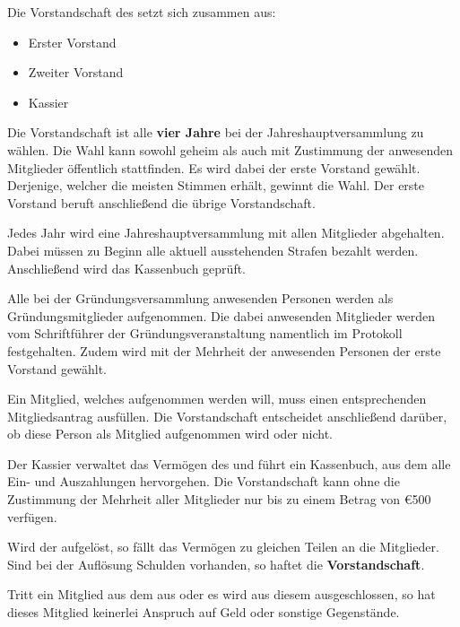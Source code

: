 Die Vorstandschaft des \emph{\vereinsName} setzt sich zusammen aus:
\begin{itemize}
    \item Erster Vorstand
    \item Zweiter Vorstand
    \item Kassier
\end{itemize}

Die Vorstandschaft ist alle \textbf{vier Jahre}
bei der Jahreshauptversammlung zu wählen.
Die Wahl kann sowohl geheim als auch mit Zustimmung der anwesenden Mitglieder
öffentlich stattfinden.
Es wird dabei der erste Vorstand gewählt.
Derjenige, welcher die meisten Stimmen erhält, gewinnt die Wahl.
Der erste Vorstand beruft anschließend die übrige Vorstandschaft.

Jedes Jahr wird eine Jahreshauptversammlung mit allen Mitglieder abgehalten.
Dabei müssen zu Beginn alle aktuell ausstehenden Strafen bezahlt werden.
Anschließend wird das Kassenbuch geprüft.

Alle bei der Gründungsversammlung anwesenden Personen werden als Gründungsmitglieder aufgenommen.
Die dabei anwesenden Mitglieder werden vom Schriftführer der Gründungsveranstaltung namentlich im Protokoll festgehalten.
Zudem wird mit der Mehrheit der anwesenden Personen der erste Vorstand gewählt.

Ein Mitglied, welches aufgenommen werden will, muss einen entsprechenden Mitgliedsantrag ausfüllen.
Die Vorstandschaft entscheidet anschließend darüber,
ob diese Person als Mitglied aufgenommen wird oder nicht.

Der Kassier verwaltet das Vermögen des \emph{\vereinsName} und führt ein Kassenbuch,
aus dem alle Ein- und Auszahlungen hervorgehen.
Die Vorstandschaft kann ohne die Zustimmung der Mehrheit aller Mitglieder
nur bis zu einem Betrag von \euro{500} verfügen.

Wird der \emph{\vereinsName} aufgelöst, so fällt das Vermögen zu gleichen Teilen an die Mitglieder.
Sind bei der Auflösung Schulden vorhanden, so haftet die \textbf{Vorstandschaft}.

Tritt ein Mitglied aus dem \emph{\vereinsName} aus oder es wird aus diesem ausgeschlossen,
so hat dieses Mitglied keinerlei Anspruch auf Geld oder sonstige Gegenstände.

